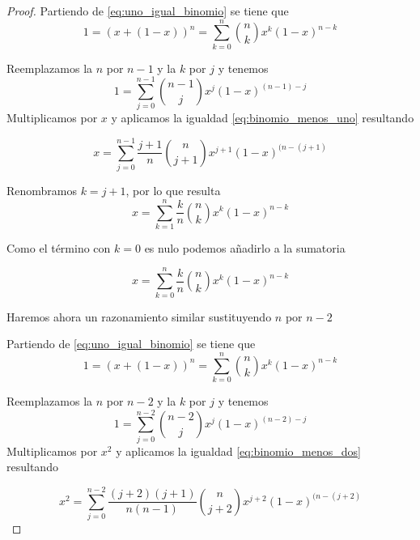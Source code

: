 \begin{proof}
    Partiendo de \ref{eq:uno_igual_binomio} se tiene que 
    \begin{equation}
        1 = (x+ (1-x))^n = \sum_{k=0}^n \binom{n}{k} x^{k} (1-x)^{n-k}
    \end{equation}

    Reemplazamos la $n$ por $n-1$ y la $k$ por $j$ y tenemos 
    \begin{equation}
        1 = \sum_{j=0}^{n-1} \binom{n-1}{j} x^{j} (1-x)^{(n-1)-j}
    \end{equation}
    Multiplicamos por $x$ y aplicamos la igualdad \ref{eq:binomio_menos_uno} resultando 

    \begin{equation}
        x = \sum_{j=0}^{n-1} \frac{j+1}{n} \binom{n}{j+1} x^{j+1} (1-x)^{(n-(j+1)}
    \end{equation}

    Renombramos $k= j+1$, por lo que resulta
    \begin{equation}
        x = \sum_{k=1}^{n} \frac{k}{n} \binom{n}{k} x^{k} (1-x)^{n-k}
    \end{equation}

    Como el término con $k=0$ es nulo podemos añadirlo a la sumatoria
    
    \begin{equation} \label{eq:desarrollo_binomio_uno}
        x = \sum_{k=0}^{n} \frac{k}{n} \binom{n}{k} x^{k} (1-x)^{n-k}
    \end{equation}

    Haremos ahora un razonamiento similar sustituyendo $n$ por $n-2$

    Partiendo de \ref{eq:uno_igual_binomio} se tiene que 
    \begin{equation}
        1 = (x+ (1-x))^n = \sum_{k=0}^n \binom{n}{k} x^{k} (1-x)^{n-k}
    \end{equation}

    Reemplazamos la $n$ por $n-2$ y la $k$ por $j$ y tenemos 
    \begin{equation}
        1 = \sum_{j=0}^{n-2} \binom{n-2}{j} x^{j} (1-x)^{(n-2)-j}
    \end{equation}
    Multiplicamos por $x^2$ y aplicamos la igualdad \ref{eq:binomio_menos_dos} resultando 

    \begin{equation}
        x^2 = \sum_{j=0}^{n-2} \frac{(j+2)(j+1)}{n(n-1)} \binom{n}{j+2} x^{j+2} (1-x)^{(n-(j+2)}
    \end{equation}


\end{proof}
